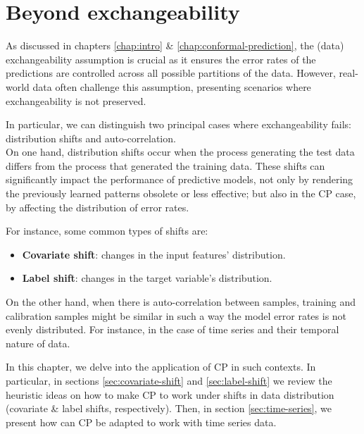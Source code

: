 \chapter{Beyond exchangeability}\label{chap:exchangeability}

As discussed in chapters \ref{chap:intro} \& \ref{chap:conformal-prediction}, the (data) exchangeability assumption is crucial as it ensures the error rates of the predictions are controlled across all possible partitions of the data. However, real-world data often challenge this assumption, presenting scenarios where exchangeability is not preserved.

In particular, we can distinguish two principal cases where exchangeability fails: distribution shifts and auto-correlation.\\

On one hand, distribution shifts occur when the process generating the test data differs from the process that generated the training data. These shifts can significantly impact the performance of predictive models, not only by rendering the previously learned patterns obsolete or less effective; but also in the CP case, by affecting the distribution of error rates.

For instance, some common types of shifts are: 
\begin{itemize}
    \item \textbf{Covariate shift}: changes in the input features' distribution.
    \item \textbf{Label shift}: changes in the target variable's distribution.
\end{itemize}

On the other hand, when there is auto-correlation between samples, training and calibration samples might be similar in such a way the model error rates is not evenly distributed. For instance, in the case of time series and their temporal nature of data. 

In this chapter, we delve into the application of CP in such contexts. In particular, in sections \ref{sec:covariate-shift} and \ref{sec:label-shift} we review the heuristic ideas on how to make CP to work under shifts in data distribution (covariate \& label shifts, respectively). Then, in section \ref{sec:time-series}, we present how can CP be adapted to work with time series data.


